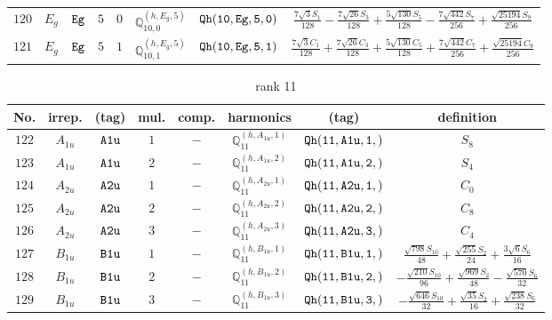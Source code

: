\documentclass[fleqn,8pt]{jsarticle}
\begin{document}
\begin{table}[ht!]
\begin{center}
\begin{tabular}{cccccccc}
$ 120 $ & $ E_{g} $ & $ {\tt Eg} $ & $ 5 $ & $ 0 $ & $ \mathbb{Q}_{10,0}^{(h,E_{g},5)} $ & $ {\tt Qh(10,Eg,5,0)} $ & $ \frac{7 \sqrt{3} S_{1}}{128} - \frac{7 \sqrt{26} S_{3}}{128} + \frac{5 \sqrt{130} S_{5}}{128} - \frac{7 \sqrt{442} S_{7}}{256} + \frac{\sqrt{25194} S_{9}}{256} $ \\
$ 121 $ & $ E_{g} $ & $ {\tt Eg} $ & $ 5 $ & $ 1 $ & $ \mathbb{Q}_{10,1}^{(h,E_{g},5)} $ & $ {\tt Qh(10,Eg,5,1)} $ & $ \frac{7 \sqrt{3} C_{1}}{128} + \frac{7 \sqrt{26} C_{3}}{128} + \frac{5 \sqrt{130} C_{5}}{128} + \frac{7 \sqrt{442} C_{7}}{256} + \frac{\sqrt{25194} C_{9}}{256} $ \\
 \hline \hline
\end{tabular}
\end{center}
\end{table}
\begin{table}[ht!]
\begin{center}
\caption{rank 11}
\renewcommand{\arraystretch}{1.3}
\begin{tabular}{cccccccc} \hline \hline
No. & irrep. & (tag) & mul. & comp. & harmonics & (tag) & definition \\ \hline
$ 122 $ & $ A_{1u} $ & $ {\tt A1u} $ & $ 1 $ & $ - $ & $ \mathbb{Q}_{11}^{(h,A_{1u},1)} $ & $ {\tt Qh(11,A1u,1,)} $ & $ S_{8} $ \\
$ 123 $ & $ A_{1u} $ & $ {\tt A1u} $ & $ 2 $ & $ - $ & $ \mathbb{Q}_{11}^{(h,A_{1u},2)} $ & $ {\tt Qh(11,A1u,2,)} $ & $ S_{4} $ \\
$ 124 $ & $ A_{2u} $ & $ {\tt A2u} $ & $ 1 $ & $ - $ & $ \mathbb{Q}_{11}^{(h,A_{2u},1)} $ & $ {\tt Qh(11,A2u,1,)} $ & $ C_{0} $ \\
$ 125 $ & $ A_{2u} $ & $ {\tt A2u} $ & $ 2 $ & $ - $ & $ \mathbb{Q}_{11}^{(h,A_{2u},2)} $ & $ {\tt Qh(11,A2u,2,)} $ & $ C_{8} $ \\
$ 126 $ & $ A_{2u} $ & $ {\tt A2u} $ & $ 3 $ & $ - $ & $ \mathbb{Q}_{11}^{(h,A_{2u},3)} $ & $ {\tt Qh(11,A2u,3,)} $ & $ C_{4} $ \\
$ 127 $ & $ B_{1u} $ & $ {\tt B1u} $ & $ 1 $ & $ - $ & $ \mathbb{Q}_{11}^{(h,B_{1u},1)} $ & $ {\tt Qh(11,B1u,1,)} $ & $ \frac{\sqrt{798} S_{10}}{48} + \frac{\sqrt{255} S_{2}}{24} + \frac{3 \sqrt{6} S_{6}}{16} $ \\
$ 128 $ & $ B_{1u} $ & $ {\tt B1u} $ & $ 2 $ & $ - $ & $ \mathbb{Q}_{11}^{(h,B_{1u},2)} $ & $ {\tt Qh(11,B1u,2,)} $ & $ - \frac{\sqrt{210} S_{10}}{96} + \frac{\sqrt{969} S_{2}}{48} - \frac{\sqrt{570} S_{6}}{32} $ \\
$ 129 $ & $ B_{1u} $ & $ {\tt B1u} $ & $ 3 $ & $ - $ & $ \mathbb{Q}_{11}^{(h,B_{1u},3)} $ & $ {\tt Qh(11,B1u,3,)} $ & $ - \frac{\sqrt{646} S_{10}}{32} + \frac{\sqrt{35} S_{2}}{16} + \frac{\sqrt{238} S_{6}}{32} $ \\

\end{tabular}
\end{center}
\end{table}
\end{document}
